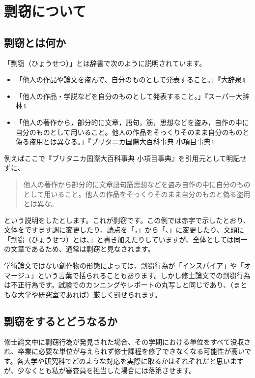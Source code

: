 \chapter{剽窃について}

\section{剽窃とは何か}
\label{sec:plagiarism}
「剽窃（ひょうせつ）」とは辞書で次のように説明されています。
\begin{itemize}
\item 「他人の作品や論文を盗んで、自分のものとして発表すること。」『大辞泉』
\item 「他人の作品・学説などを自分のものとして発表すること。」『スーパー大辞林』
\item 「他人の著作から，部分的に文章，語句，筋，思想などを盗み，自作の中に自分のものとして用いること。他人の作品をそっくりそのまま自分のものと偽る盗用とは異なる。」『ブリタニカ国際大百科事典 小項目事典』
\end{itemize}

例えばここで『ブリタニカ国際大百科事典 小項目事典』を引用元として明記せずに、
\begin{quotation}
  他人の著作から部分的に文章語句筋思想などを盗み自作の中に自分のものとして用いること。他人の作品をそっくりそのまま自分のものと偽る盗用とは異な。
\end{quotation}
という説明をしたとします。これが剽窃です。この例では赤字で示したとおり、文体をですます調に変更したり、読点を「，」から「、」に変更したり、文頭に「剽窃（ひょうせつ）とは、」と書き加えたりしていますが、全体としては同一の文章であるため、通常は剽窃と見なされます。

学術論文ではない創作物の形態によっては、剽窃行為が「インスパイア」や「オマージュ」という言葉で括られることもあります。しかし修士論文での剽窃行為は不正行為です。試験でのカンニングやレポートの丸写しと同じであり、（まともな大学や研究室であれば）厳しく罰せられます。

\section{剽窃をするとどうなるか}

修士論文中に剽窃行為が発見された場合、その学期における単位をすべて没収され、卒業に必要な単位が与えられず修士課程を修了できなくなる可能性が高いです。各大学や研究科でどのような対応を実際に取るかはそれぞれだと思いますが、少なくとも私が審査員を担当した場合には落第させます。

